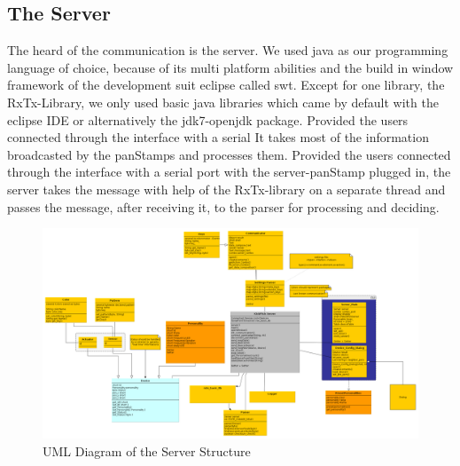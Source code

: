 \subsection{The Server}
The heard of the communication is the server. We used java\cite{java} as our programming language of choice, because of its multi platform abilities and the build in window framework of the development suit eclipse\cite{eclipse} called swt\cite{swt}. Except for one library, the RxTx-Library\cite{rxtx}, we only used basic java libraries which came by default with the eclipse IDE\cite{ide}  or alternatively the jdk7-openjdk\cite{open_jdk} package.
Provided the users connected through the interface with a serial It takes most of the information broadcasted by the panStamps\cite{panstamp} and processes them.
Provided the users connected through the interface with a serial port with the server-panStamp plugged in, the server takes the message with help of the RxTx-library\cite{rxtx} on a separate thread and passes the message, after receiving it, to the parser for processing and deciding.

\begin{figure}[ht]
	\centerline{\includegraphics[width=\textwidth]{./graph/general.png}}
	\caption{UML Diagram of the Server Structure}
	\label{fig:server_uml}
\end{figure}
	


